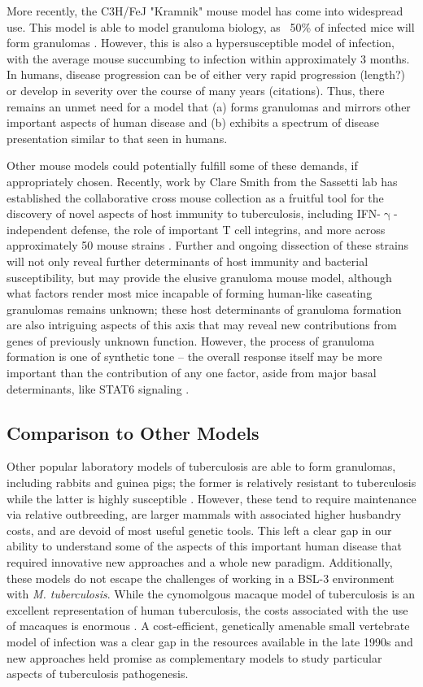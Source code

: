 More recently, the C3H/FeJ "Kramnik" mouse model has come into widespread use. This model is able to model granuloma biology, as ~50\% of infected mice will form granulomas \citep{Harper2012, Lenaerts2015}. However, this is also a hypersusceptible model of infection, with the average mouse succumbing to infection within approximately 3 months. In humans, disease progression can be of either very rapid progression (length?) or develop in severity over the course of many years (citations). Thus, there remains an unmet need for a model that (a) forms granulomas and mirrors other important aspects of human disease and (b) exhibits a spectrum of disease presentation similar to that seen in humans. 

Other mouse models could potentially fulfill some of these demands, if appropriately chosen. Recently, work by Clare Smith from the Sassetti lab has established the collaborative cross mouse collection as a fruitful tool for the discovery of novel aspects of host immunity to tuberculosis, including IFN-$\upgamma$-independent defense, the role of important T cell integrins, and more across approximately 50 mouse strains \citep{Smith2016, Smith2022}. Further and ongoing dissection of these strains will not only reveal further determinants of host immunity and bacterial susceptibility, but may provide the elusive granuloma mouse model, although what factors render most mice incapable of forming human-like caseating granulomas remains unknown; these host determinants of granuloma formation are also intriguing aspects of this axis that may reveal new contributions from genes of previously unknown function. However, the process of granuloma formation is one of synthetic tone -- the overall response itself may be more important than the contribution of any one factor, aside from major basal determinants, like STAT6 signaling \citep{Cronan2021}.

\subsection{Comparison to Other Models}

Other popular laboratory models of tuberculosis are able to form granulomas, including rabbits and guinea pigs; the former is relatively resistant to tuberculosis while the latter is highly susceptible \citep{Clark2014, Dorman2004, Heppleston1949}. However, these tend to require maintenance via relative outbreeding, are larger mammals with associated higher husbandry costs, and are devoid of most useful genetic tools. This left a clear gap in our ability to understand some of the aspects of this important human disease that required innovative new approaches and a whole new paradigm. Additionally, these models do not escape the challenges of working in a BSL-3 environment with \textit{M. tuberculosis}. While the cynomolgous macaque model of tuberculosis is an excellent representation of human tuberculosis, the costs associated with the use of macaques is enormous \citep{Pena2015}. A cost-efficient, genetically amenable small vertebrate model of infection was a clear gap in the resources available in the late 1990s and new approaches held promise as complementary models to study particular aspects of tuberculosis pathogenesis.

